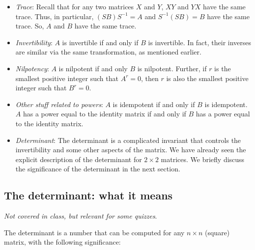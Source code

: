 \documentclass[10pt]{amsart}
\begin{document}
\begin{itemize}
\item {\em Trace}: Recall that for any two matrices $X$ and $Y$, $XY$
  and $YX$ have the same trace. Thus, in particular, $(SB)S^{-1} = A$
  and $S^{-1}(SB)= B$ have the same trace. So, $A$ and $B$ have the
  same trace.
\item {\em Invertibility}: $A$ is invertible if and only if $B$ is
  invertible. In fact, their inverses are similar via the same
  transformation, as mentioned earlier.
\item {\em Nilpotency}: $A$ is nilpotent if and only $B$ is
  nilpotent. Further, if $r$ is the smallest positive integer such
  that $A^r = 0$, then $r$ is also the smallest positive integer such
  that $B^r = 0$.
\item {\em Other stuff related to powers}: $A$ is idempotent if and
  only if $B$ is idempotent. $A$ has a power equal to the identity
  matrix if and only if $B$ has a power equal to the identity matrix.
\item {\em Determinant}: The determinant is a complicated invariant
  that controls the invertibility and some other aspects of the
  matrix. We have already seen the explicit description of the
  determinant for $2 \times 2$ matrices. We briefly discuss the
  significance of the determinant in the next section.
\end{itemize}

\subsection{The determinant: what it means}

{\em Not covered in class, but relevant for some quizzes}.

The determinant is a number that can be computed for any $n \times n$
(square) matrix, with the following significance:
\end{document}
